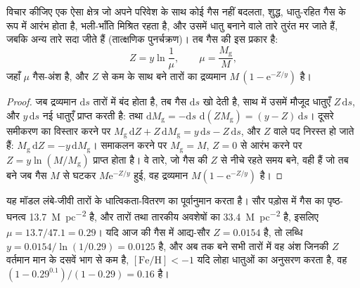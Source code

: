 \begin{theorem}[बंद-पेटिका मॉडल]\label{thm:b3:origin-of-elements:closed-box}
विचार कीजिए एक ऐसा क्षेत्र जो अपने परिवेश के साथ कोई गैस नहीं बदलता, शुद्ध,
धातु-रहित गैस के रूप में आरंभ होता है, भली-भाँति मिश्रित रहता है, और उसमें
धातु बनाने वाले तारे तुरंत मर जाते हैं, जबकि अन्य तारे सदा जीते हैं
(तात्क्षणिक पुनर्चक्रण)। तब गैस की  इस प्रकार है:
\[
Z = y \ln\frac{1}{\mu}, \qquad \mu = \frac{M_\mathrm{g}}{M},
\]
जहाँ $\mu$ गैस-अंश है, और
$Z$ से कम  के साथ बने तारों का द्रव्यमान \mbox{$M\,(1 - \mathrm{e}^{-Z/y})$} है।
\end{theorem}

\begin{proof}
जब द्रव्यमान $\mathrm{d}s$ तारों में बंद होता है, तब गैस
$\mathrm{d}s$ खो देती है, साथ में उसमें मौजूद धातुएँ $Z\,\mathrm{d}s$,
और $y\,\mathrm{d}s$ नई धातुएँ प्राप्त करती है:
तथा $\mathrm{d}M_\mathrm{g} = -\mathrm{d}s$
$\mathrm{d}(Z M_\mathrm{g}) = (y - Z)\,\mathrm{d}s$। दूसरे समीकरण का
विस्तार करने पर $M_\mathrm{g}\,\mathrm{d}Z + Z\,\mathrm{d}M_\mathrm{g} =
y\,\mathrm{d}s - Z\,\mathrm{d}s$, और $Z$ वाले पद निरस्त हो जाते हैं:
$M_\mathrm{g}\,\mathrm{d}Z = -y\,\mathrm{d}M_\mathrm{g}$। समाकलन करने पर
$M_\mathrm{g} = M$, $Z = 0$ से आरंभ करने पर $Z = y\ln(M/M_\mathrm{g})$ प्राप्त होता है। वे
तारे, जो गैस की  $Z$ से नीचे रहते समय बने, वही हैं
जो तब बने जब गैस $M$ से घटकर $M\mathrm{e}^{-Z/y}$ हुई, वह द्रव्यमान
$M(1 - \mathrm{e}^{-Z/y})$ है।
\end{proof}

यह मॉडल लंबे-जीवी तारों के धात्विकता-वितरण का पूर्वानुमान करता है।
सौर पड़ोस में गैस का पृष्ठ-घनत्व
\qty{13.7}{M_\odot.pc^{-2}} है, और तारों तथा तारकीय अवशेषों का
\qty{33.4}{M_\odot.pc^{-2}} है, इसलिए $\mu = 13.7/47.1 = 0.29$।
यदि आज की गैस में आद्य-सौर $Z = 0.0154$ है, तो लब्धि
$y = 0.0154/\ln(1/0.29) = 0.0125$ है, और अब तक बने सभी तारों में वह अंश
जिनकी $Z$ वर्तमान मान के दसवें भाग से कम है,
$[\mathrm{Fe/H}] < -1$ यदि लोहा धातुओं का अनुसरण करता है, वह
$(1 - 0.29^{0.1})/(1 - 0.29) = 0.16$ है।

